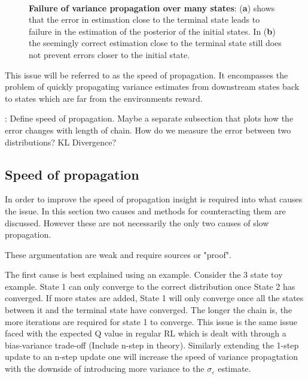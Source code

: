 \begin{figure}[H]
    \centering
    \\
    \caption{\textbf{Failure of variance propagation over many states}: (\textbf{a}) shows that the error in estimation close to the terminal state leads to failure in the estimation of the posterior of the initial states. In (\textbf{b}) the seemingly correct estimation close to the terminal state still does not prevent errors closer to the initial state.}
    \label{fig:longproptest}
\end{figure}

This issue will be referred to as the speed of propagation. It encompasses the problem of quickly propagating variance estimates from downstream states back to states which are far from the environments reward.

\todo: Define speed of propagation. Maybe a separate subsection that plots how the error changes with length of chain. How do we measure the error between two distributions? KL Divergence?

\subsection{Speed of propagation}

In order to improve the speed of propagation insight is required into what causes the issue. In this section two causes and methods for counteracting them are discussed. However these are not necessarily the only two causes of slow propagation.

\todo These argumentation are weak and require sources or "proof". 

The first cause is best explained using an example. Consider the 3 state toy example. State 1 can only converge to the correct distribution once State 2 has converged. If more states are added, State 1 will only converge once all the states between it and the terminal state have converged. The longer the chain is, the more iterations are required for state 1 to converge. This issue is the same issue faced with the expected Q value in regular RL which is dealt with through a bias-variance trade-off (\todo Include n-step in theory). Similarly extending the 1-step update to an n-step update one will increase the speed of variance propagtation with the downside of introducing more variance to the $\sigma_\varepsilon$ estimate.

